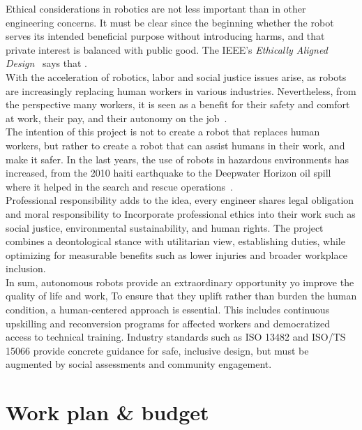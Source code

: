 Ethical considerations in robotics are not less important than in other engineering concerns. It must be clear since the beginning whether the robot serves its intended beneficial purpose without introducing harms, and that private interest is balanced with public good. The IEEE's \textit{Ethically Aligned Design}~\cite{8058187} says that .\\
With the acceleration of robotics, labor and social justice issues arise, as robots are increasingly replacing human workers in various industries. Nevertheless, from the perspective many workers, it is seen as a benefit for their safety and comfort at work, their pay, and their autonomy on the job~\cite{armstrong2024automationworkersperspective}.\\
The intention of this project is not to create a robot that replaces human workers, but rather to create a robot that can assist humans in their work, and make it safer. In the last years, the use of robots in hazardous environments has increased, from the 2010 haiti earthquake to the Deepwater Horizon oil spill where it helped in the search and rescue operations~\cite{10.7551/mitpress/9407.003.0012}.\\
Professional responsibility adds to the idea, every engineer shares legal obligation and moral responsibility to Incorporate professional ethics into their work such as social justice, environmental sustainability, and human rights. The project combines a deontological stance with utilitarian view, establishing duties, while optimizing for measurable benefits such as lower injuries and broader workplace inclusion.\\
In sum, autonomous robots provide an extraordinary opportunity yo improve the quality of life and work, To ensure that they uplift rather than burden the human condition, a human-centered approach is essential. This includes continuous upskilling and reconversion programs for affected workers and democratized access to technical training. Industry standards such as ISO 13482 and ISO/TS 15066 provide concrete guidance for safe, inclusive design, but must be augmented by social assessments and community engagement.

\chapter{Work plan \& budget}\label{sec:work_plan_budget}

